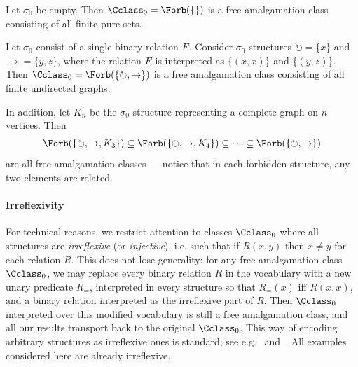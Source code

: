 
\begin{myexample}\label{ex:free-amalg-equality}
    Let $\sigma_0$ be empty. 
    Then $\Cclass_0 = \Forb(\{\})$ is a free amalgamation class consisting of all finite pure sets.
\end{myexample}

\begin{myexample}\label{ex:free-amalg-graphs}
    Let $\sigma_0$ consist of a single binary relation $E$. 
    Consider $\sigma_0$-structures ${\circlearrowright} = \{x\}$ and ${\rightarrow} = \{y, z\}$, where the relation $E$ is interpreted as $\{(x, x)\}$ and $\{(y, z)\}$.
    Then $\Cclass_0 = \Forb(\{{\circlearrowright}, {\rightarrow}\})$ is a free amalgamation class consisting of all finite undirected graphs.

    In addition, let $K_n$ be the $\sigma_0$-structure representing a complete graph on $n$ vertices.
    Then 
    \begin{align*}
        \Forb(\{{\circlearrowright}, {\rightarrow}, K_3\}) 
        \subseteq \Forb(\{{\circlearrowright}, {\rightarrow}, K_4\})
        \subseteq \cdots 
        \subseteq \Forb(\{{\circlearrowright}, {\rightarrow}\})
    \end{align*}    
    are all free amalgamation classes --- notice that in each forbidden structure, any two elements are related. 
\end{myexample}

\paragraph*{Irreflexivity} 
For technical reasons, we restrict attention to classes $\Cclass_0$ where all structures are {\em irreflexive} (or \emph{injective}), i.e. such that if $R(x,y)$ then $x\neq y$ for each relation $R$. This does not lose generality: for any free amalgamation class $\Cclass_0$, we may replace every binary relation $R$ in the vocabulary with a new unary predicate $R_=$, interpreted in every structure so that $R_=(x)$ iff $R(x,x)$, and a binary relation interpreted as the irreflexive part of $R$. Then $\Cclass_0$ interpreted over this modified vocabulary is still a free amalgamation class, and all our results transport back to the original $\Cclass_0$. This way of encoding arbitrary structures as irreflexive ones is standard; see e.g.~\cite[Sec.~2.4]{Herwig1998} and~\cite[p.~121]{SS20}. All examples considered here are already irreflexive.

